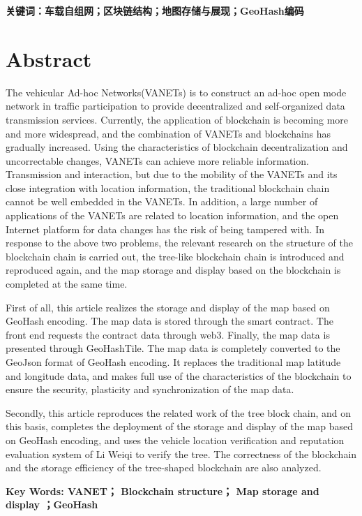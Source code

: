 \vspace{4ex}\noindent\textbf{\heiti 关键词：车载自组网；区块链结构；地图存储与展现；GeoHash编码}
\newpage

\vspace*{-2mm}

\begin{spacing}{0.95}
  \centering
  \heiti{}\textbf{\thesisTitleEN}
\end{spacing}

\vspace*{5mm}

{\let\clearpage\relax \chapter*{
  \textmd{Abstract}\vskip -3bp}}
\setcounter{page}{2}

\setlength{\parskip}{0em}

The vehicular Ad-hoc Networks(VANETs) is to construct an ad-hoc open mode network in traffic participation to provide decentralized and self-organized data transmission services. Currently, the application of blockchain is becoming more and more widespread, and the combination of VANETs and blockchains has gradually increased. Using the characteristics of blockchain decentralization and uncorrectable changes, VANETs can achieve more reliable information. Transmission and interaction, but due to the mobility of the VANETs and its close integration with location information, the traditional blockchain chain cannot be well embedded in the VANETs. In addition, a large number of applications of the VANETs are related to location information, and the open Internet platform for data changes has the risk of being tampered with. In response to the above two problems, the relevant research on the structure of the blockchain chain is carried out, the tree-like blockchain chain is introduced and reproduced again, and the map storage and display based on the blockchain is completed at the same time.

First of all, this article realizes the storage and display of the map based on GeoHash encoding. The map data is stored through the smart contract. The front end requests the contract data through web3. Finally, the map data is presented through GeoHashTile. The map data is completely converted to the GeoJson format of GeoHash encoding. It replaces the traditional map latitude and longitude data, and makes full use of the characteristics of the blockchain to ensure the security, plasticity and synchronization of the map data.

Secondly, this article reproduces the related work of the tree block chain, and on this basis, completes the deployment of the storage and display of the map based on GeoHash encoding, and uses the vehicle location verification and reputation evaluation system of Li Weiqi to verify the tree. The correctness of the blockchain and the storage efficiency of the tree-shaped blockchain are also analyzed.

\vspace{3ex}\noindent\textbf{Key Words: VANET； Blockchain structure； Map storage and display ；GeoHash}
\newpage
